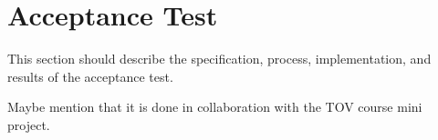 \section{Acceptance Test}
This section should describe the specification, process, implementation, and results of the acceptance test.

Maybe mention that it is done in collaboration with the TOV course mini project.